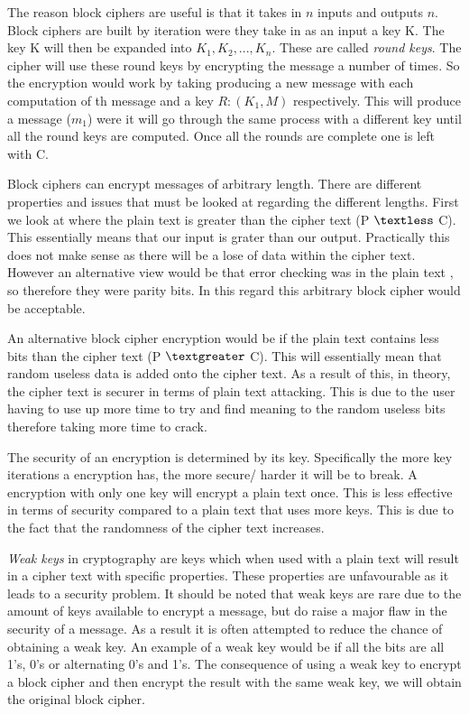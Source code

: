 \documentclass[11pt,a4paper]{report}
\begin{document}
The reason block ciphers are useful is that it takes in $n$ inputs and outputs $n$. Block ciphers are built by iteration were they take in as an input a key K. The key K will then be expanded into $K_{1}, K_{2},..., K_{n}$. These are called \emph{round keys}. The cipher will use these round keys by encrypting the message a number of times. So the encryption would work by taking producing a new message with each computation of th message and a key $R: (K_{1}, M)$ respectively. This will produce a message ($m_{1}$) were it will go through the same process with a different key until all the round keys are computed. Once all the rounds are complete one is left with C.

Block ciphers can encrypt messages of arbitrary length. There are different properties and issues that must be looked at regarding the different lengths. First we look at where the plain text is greater than the cipher text (P $\textless$ C). This essentially means that our input is grater than our output. Practically this does not make sense as there will be a lose of data within the cipher text. However an alternative view would be that error checking was in the plain text , so therefore they were parity bits. In this regard this arbitrary block cipher would be acceptable. 

An alternative block cipher encryption would be if the plain text contains less bits than the cipher text (P $\textgreater$ C). This will essentially mean that random useless data is added onto the cipher text. As a result of this, in theory, the cipher text is securer in terms of plain text attacking. This is due to the user having to use up more time to try and find meaning to the random useless bits therefore taking more time to crack. 

The security of an encryption is determined by its key. Specifically the more key iterations a encryption has, the more secure/ harder it will be to break. A encryption with only one key will encrypt a plain text once. This is less effective in terms of security compared to a plain text that uses more keys. This is due to the fact that the randomness of the cipher text increases.

\emph{Weak keys} in cryptography are keys which when used with a plain text will result in a cipher text with specific properties. These properties are unfavourable as it leads to a security problem. It should be noted that weak keys are rare due to the amount of keys available to encrypt a message, but do raise a major flaw in the security of a message. As a result it is often attempted to reduce the chance of obtaining a weak key. An example of a weak key would be if all the bits are all 1's, 0's or alternating 0's and 1's. The consequence of using a weak key to encrypt a block cipher and then encrypt the result with the same weak key, we will obtain the original block cipher. 
\end{document}
